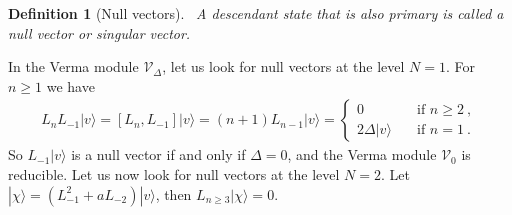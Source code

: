 \documentclass[12pt, a4paper]{article}
\theoremstyle{break}
\newtheorem{defn}[exo]{Definition}
\begin{document}
\begin{defn}[Null vectors]
 ~\label{def:nv}
 A descendant state that is also primary is called a null vector or singular vector.
\end{defn}
In the Verma module $\mathcal V_\Delta$, let us look for null vectors at the level $N=1$. For $n\geq 1$ we have 
\begin{align}
L_n L_{-1}|v\rangle = [L_n, L_{-1}] |v\rangle = (n+1) L_{n-1}|v\rangle = 
\left\{\begin{array}{ll} 0 &  \quad \text{if } n\geq 2\ , \\ 2\Delta |v\rangle & \quad \text{if } n = 1\ . \end{array}\right. 
\end{align}
So $L_{-1}|v\rangle$ is a null vector if and only if $\Delta=0$, and the Verma module $\mathcal V_0$ is reducible.
Let us now look for null vectors at the level $N=2$. Let $|\chi\rangle = (L_{-1}^2 + a L_{-2})|v\rangle$, then $L_{n\geq 3} |\chi \rangle =0$. 
\end{document}
